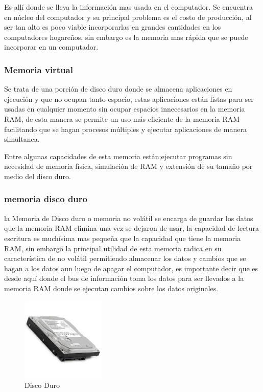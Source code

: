 \documentclass{article}
\begin{document}
        Es allí donde se lleva la información mas usada en el computador. Se encuentra en núcleo del computador y su principal problema es el costo de producción, al ser tan alto es poco viable incorporarlas en grandes cantidades en los computadores hogareños, sin embargo es la memoria mas rápida que se puede incorporar en un computador.   
        
        
        
        
        \subsubsection{Memoria virtual}
        Se trata de una porción de disco duro donde se almacena aplicaciones en ejecución y que no ocupan tanto espacio, estas aplicaciones están listas para ser usadas en cualquier momento sin ocupar espacios innecesarios en la memoria RAM, de esta manera se permite un uso más eficiente de la memoria RAM facilitando que se hagan procesos múltiples y ejecutar aplicaciones de manera simultanea.
        
        Entre algunas capacidades de esta memoria están;ejecutar programas sin necesidad de memoria física, simulación de RAM y extensión de su tamaño por medio del disco duro.\cite{gestion}  
        
        \subsubsection{memoria disco duro}
        la Memoria de Disco duro o memoria no volátil se encarga de guardar los datos que la memoria RAM elimina una vez se dejaron de usar, la capacidad de lectura  escritura es muchísima mas pequeña que la capacidad que tiene la memoria RAM, sin embargo la principal utilidad de esta memoria radica en su característica de no volátil permitiendo almacenar los datos y cambios que se hagan a los datos aun luego de apagar el computador, es importante decir que es desde aquí donde el bus de información toma los datos para ser llevados a la memoria RAM donde se ejecutan cambios sobre los datos originales. 
        
        \begin{figure}[h]
        \includegraphics[width=4cm]{discoDuro.jpg}
        \centering
        \caption{Disco Duro}
        \label{fig:discoDuro}
        \end{figure}
        
\end{document}
